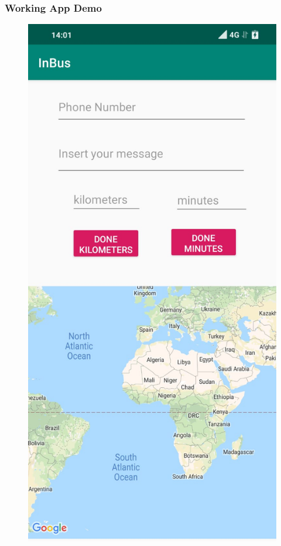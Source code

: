\documentclass{beamer}
\begin{document}
\begin{frame}\frametitle{Working App Demo}
   \begin{figure}[h!]
   \begin{center}
   \includegraphics[scale=0.11]{app.jpg}
   \end{center}
   \end{figure}
\end{frame}
\end{document}
